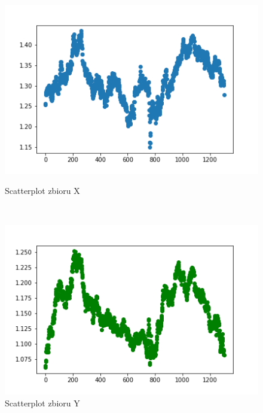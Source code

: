 \documentclass[12pt]{mwart}
\begin{document}
	\begin{figure}[H]
		\begin{minipage}{.5\linewidth}
			\centering
			\includegraphics[scale=0.7]{X_sc.PNG}
			\caption{Scatterplot zbioru X}
		\end{minipage}
		$\quad$
		\begin{minipage}{.5\linewidth}
			\centering
			\includegraphics[scale=0.7]{Y_sc.PNG}
			\caption{Scatterplot zbioru Y}
		\end{minipage}
	\end{figure}
\end{document}
